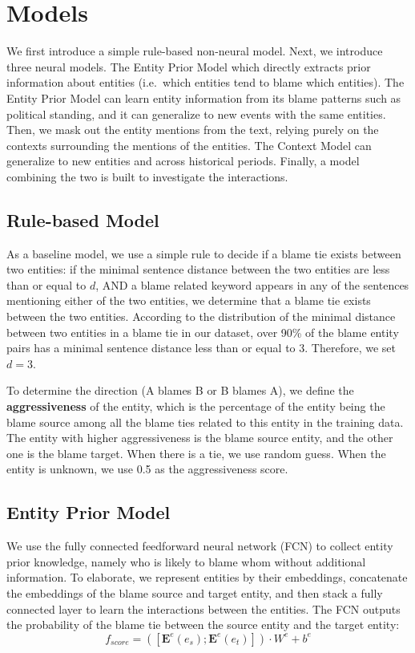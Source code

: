 \documentclass[letterpaper]{article} %
\begin{document}
\section{Models}

We first introduce a simple rule-based non-neural model. Next, we introduce three neural models. The Entity Prior Model which directly extracts prior information about entities (i.e.\ which entities tend to blame which entities). The Entity Prior Model can learn entity information from its blame patterns such as political standing, and it can generalize to new events with the same entities. Then, we mask out the entity mentions from the text, relying purely on the contexts surrounding the mentions of the entities. The Context Model can generalize to new entities and across historical periods. Finally, a model combining the two is built to investigate the interactions.

\subsection{Rule-based Model}
As a baseline model, we use a simple rule to decide if a blame tie exists between two entities: if the minimal sentence distance between the two entities are less than or equal to $d$, AND a blame related keyword appears in any of the sentences mentioning either of the two entities, we determine that a blame tie exists between the two entities. According to the distribution of the minimal distance between two entities in a blame tie in our dataset, over 90\% of the blame entity pairs has a minimal sentence distance less than or equal to 3. Therefore, we set $d=3$.

To determine the direction (A blames B or B blames A), we define the {\bf aggressiveness} of the entity, which is the percentage of the entity being the blame source among all the blame ties related to this entity in the training data. The entity with higher aggressiveness is the blame source entity, and the other one is the blame target. When there is a tie, we use random guess. When the entity is unknown, we use 0.5 as the aggressiveness score.

\subsection{Entity Prior Model}
\label{entitymodel}
We use the fully connected feedforward neural network (FCN) to collect entity prior knowledge, namely who is likely to blame whom without additional information. To elaborate, we represent entities by their embeddings, concatenate the embeddings of the blame source and target entity, and then stack a fully connected layer to learn the interactions between the entities. The FCN outputs the probability of the blame tie between the source entity and the target entity: $$f_{score} = ([\mathbf{E}^e(e_s); \mathbf{E}^e(e_t)]) \cdot W^e + b^e $$
\end{document}
